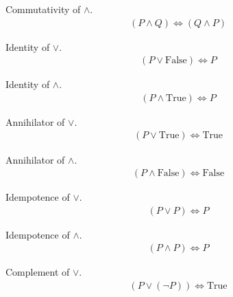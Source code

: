 \begin{prop}
\label{Proposition:land_commutativity}
Commutativity of $\land$.
\begin{align*}
(P \land Q) \iff (Q \land P)
\end{align*}
\end{prop}

\begin{prop}
\label{Proposition:lor_identity}
Identity of $\lor$.
\begin{align*}
(P \lor \text{False}) \iff P
\end{align*}
\end{prop}

\begin{prop}
\label{Proposition:land_identity}
Identity of $\land$.
\begin{align*}
(P \land \text{True}) \iff P
\end{align*}
\end{prop}

\begin{prop}
\label{Proposition:lor_annihilator}
Annihilator of $\lor$.
\begin{align*}
(P \lor \text{True}) \iff \text{True}
\end{align*}
\end{prop}

\begin{prop}
\label{Proposition:land_annihilator}
Annihilator of $\land$.
\begin{align*}
(P \land \text{False}) \iff \text{False}
\end{align*}
\end{prop}

\begin{prop}
\label{Proposition:lor_idempotence}
Idempotence of $\lor$.
\begin{align*}
(P \lor P) \iff P
\end{align*}
\end{prop}

\begin{prop}
\label{Proposition:land_idempotence}
Idempotence of $\land$.
\begin{align*}
(P \land P) \iff P
\end{align*}
\end{prop}

\begin{prop}
\label{Proposition:lor_complement}
Complement of $\lor$.
\begin{align*}
(P \lor (\lnot P)) \iff \text{True}
\end{align*}
\end{prop}

